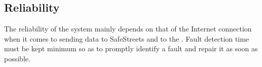 \documentclass[../../../RASD.tex]{subfiles}
\begin{document}
\subsection{Reliability\label{sect:3.5.1}}

The reliability of the system mainly depends on that of the Internet connection when it comes to sending data to SafeStreets and to the . Fault detection time must be kept minimum so as to promptly identify a fault and repair it as soon as possible. 
\end{document}
